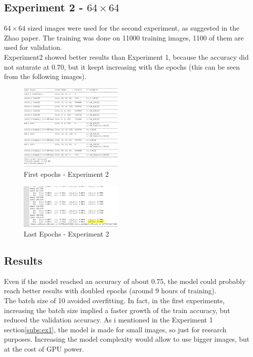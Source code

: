 \documentclass[twocolumn,showpacs,%
  nofootinbib,aps,superscriptaddress,%
  eqsecnum,prd,notitlepage,showkeys,10pt]{revtex4-1}
\begin{document}
\subsection{Experiment 2 - $64\times64$}
$64\times64$ sized images were used for the second experiment, as suggested in the Zhao paper. The training was done on 11000 training images, 1100 of them are used for validation.\\
Experiment2 showed better results than Experiment 1, because the accuracy did not saturate at 0.70, but it keept increasing with the epochs (this can be seen from the following images).
\begin{figure}[H]
    \includegraphics[width=0.45\textwidth]{images/fit_first_64x150.PNG}
    \caption{\label{fig:ex2}First epochs - Experiment 2}
\end{figure}
\begin{figure}[H]
    \includegraphics[width=0.45\textwidth]{images/fit_last_64x150.PNG}
    \caption{\label{fig:noise}Last Epochs - Experiment 2}
\end{figure}

\subsection{Results}
Even if the model reached an accuracy of about 0.75, the model could probably reach better results with doubled epochs (around 9 hours of training).\\
The batch size of 10 avoided overfitting. In fact, in the first experiments, increasing the batch size implied a faster growth of the train accuracy, but reduced the validation accuracy.
As i mentioned in the Experiment 1 section\ref{subs:ex1}, the model is made for small images, so just for research purposes. Increasing the model complexity would allow to use bigger images, but at the cost of GPU power.\\
\end{document}
